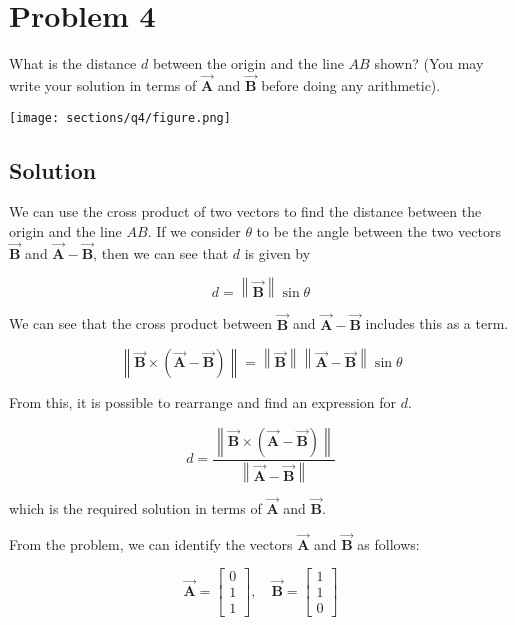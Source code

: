 \section*{Problem 4}

What is the distance \( d \) between the origin and the line \( AB \) shown?
(You may write your solution in terms of \( \vec{\mathbf{A}} \) and \( \vec{\mathbf{B}} \) before doing any arithmetic).

\begin{figure*}[h]
    \centering
    \texttt{[image: sections/q4/figure.png]}
\end{figure*}

\subsection*{Solution}

We can use the cross product of two vectors to find the distance between the origin and the line \( AB \).
If we consider \( \theta \) to be the angle between the two vectors \( \vec{\mathbf{B}} \) and \( \vec{\mathbf{A}} - \vec{\mathbf{B}} \), then we can see that \( d \) is given by

\[
    d = \left\lVert \vec{\mathbf{B}} \right\rVert \sin{\theta}
\]

We can see that the cross product between \( \vec{\mathbf{B}} \) and \( \vec{\mathbf{A}} - \vec{\mathbf{B}} \) includes this as a term.

\[
    \left\lVert \vec{\mathbf{B}} \times (\vec{\mathbf{A}} - \vec{\mathbf{B}}) \right\rVert = \left\lVert \vec{\mathbf{B}} \right\rVert \left\lVert \vec{\mathbf{A}} - \vec{\mathbf{B}} \right\rVert \sin{\theta}
\]

From this, it is possible to rearrange and find an expression for \( d \).

\[
    \boxed{
        d = \frac{\left\lVert \vec{\mathbf{B}} \times (\vec{\mathbf{A}} - \vec{\mathbf{B}}) \right\rVert}{\left\lVert \vec{\mathbf{A}} - \vec{\mathbf{B}} \right\rVert}
    }
\]

which is the required solution in terms of \( \vec{\mathbf{A}} \) and \( \vec{\mathbf{B}} \).

From the problem, we can identify the vectors \( \vec{\mathbf{A}} \) and \( \vec{\mathbf{B}} \) as follows:

\[
    \vec{\mathbf{A}} = \begin{bmatrix} 0 \\ 1 \\ 1 \end{bmatrix}, \quad \vec{\mathbf{B}} = \begin{bmatrix} 1 \\ 1 \\ 0 \end{bmatrix}
\]

